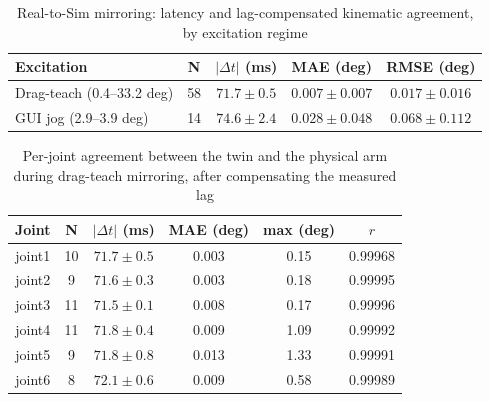 
\begin{table}[t]
\caption{Real-to-Sim mirroring: latency and lag-compensated kinematic agreement, by excitation regime}
\begin{center}
\renewcommand{\arraystretch}{1.12}
\begin{tabular}{|p{1.75cm}|c|c|c|c|}
\hline
\textbf{Excitation} & \textbf{N} & \textbf{$|\Delta t|$ (ms)} & \textbf{MAE (deg)} & \textbf{RMSE (deg)} \\
\hline
Drag-teach (0.4--33.2 deg) & 58 & $71.7 \pm 0.5$ & $0.007 \pm 0.007$ & $0.017 \pm 0.016$ \\
\hline
GUI jog (2.9--3.9 deg) & 14 & $74.6 \pm 2.4$ & $0.028 \pm 0.048$ & $0.068 \pm 0.112$ \\
\hline
\end{tabular}
\label{tab:latency}
\end{center}
\end{table}

\begin{table}[t]
\caption{Per-joint agreement between the twin and the physical arm during drag-teach mirroring, after compensating the measured lag}
\begin{center}
\renewcommand{\arraystretch}{1.12}
\begin{tabular}{|c|c|c|c|c|c|}
\hline
\textbf{Joint} & \textbf{N} & \textbf{$|\Delta t|$ (ms)} & \textbf{MAE (deg)} & \textbf{max (deg)} & \textbf{$r$} \\
\hline
joint1 & 10 & $71.7 \pm 0.5$ & 0.003 & 0.15 & 0.99968 \\
\hline
joint2 & 9 & $71.6 \pm 0.3$ & 0.003 & 0.18 & 0.99995 \\
\hline
joint3 & 11 & $71.5 \pm 0.1$ & 0.008 & 0.17 & 0.99996 \\
\hline
joint4 & 11 & $71.8 \pm 0.4$ & 0.009 & 1.09 & 0.99992 \\
\hline
joint5 & 9 & $71.8 \pm 0.8$ & 0.013 & 1.33 & 0.99991 \\
\hline
joint6 & 8 & $72.1 \pm 0.6$ & 0.009 & 0.58 & 0.99989 \\
\hline
\end{tabular}
\label{tab:perjoint}
\end{center}
\end{table}
